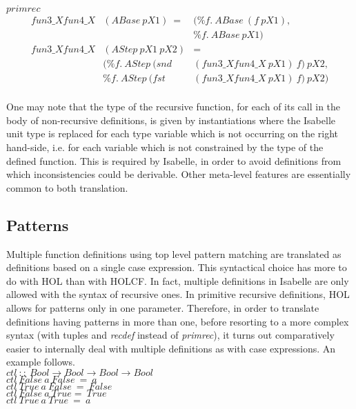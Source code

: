 \documentclass{llncs}
\begin{document}
\noindent $primrec$ 
$$\begin{array}{lll}
fun3\_Xfun4\_X & (ABase \ pX1) \ = & (\% f. \ ABase \ (f \ pX1), \\
                           &        &  \% f. \ ABase \ pX1) \\
fun3\_Xfun4\_X & (AStep \ pX1 \ pX2) & =  \\
  & (\% f. \ AStep \ (snd & (fun3\_Xfun4\_X \ pX1) \ f) \ pX2, \\
  &  \% f. \ AStep \ (fst & (fun3\_Xfun4\_X \ pX1) \ f) \ pX2) \\
\end{array}$$

\noindent One may note that the type of the recursive function, 
for each of its call in the body of non-recursive definitions, is given by
instantiations where the Isabelle unit type is replaced for each type variable
which is not occurring on the right hand-side, i.e. for each variable which is
not constrained by the type of the defined function. This is required by
Isabelle, in order to avoid definitions from which inconsistencies could be
derivable. Other meta-level features are essentially common to both
translation.


\subsection{Patterns}
\label{sec:Patterns}


Multiple function definitions using top level pattern matching are translated
as definitions based on a single case expression. This syntactical choice has
more to do with HOL than with HOLCF. In fact, multiple definitions in Isabelle
are only allowed with the syntax of recursive ones. In primitive recursive
definitions, HOL allows for patterns only in one parameter. Therefore, in
order to translate definitions having patterns in more than one, before
resorting to a more complex syntax (with tuples and \emph{recdef} instead of
\emph{primrec}), it turns out comparatively easier to internally deal with
multiple definitions as with case expressions. An example follows.
\\

\noindent $ctl \ :: \ Bool \to Bool \to Bool \to Bool$ \\
$ctl \ False \ a \ False \ = \ a $\\
$ctl \ True \ a \ False \ = \ False $\\
$ctl \ False \ a \ True  = \ True $\\
$ctl \ True \ a \ True \ = \ a $\\
\end{document}

